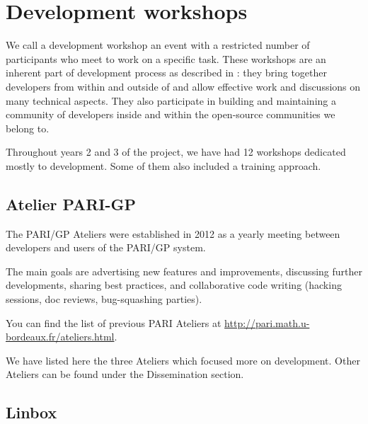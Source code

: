 \documentclass{deliverablereport}
\author{Viviane Pons et al.}
\begin{document}
\enlargethispage{4ex}
\maketitle
\githubissuedescription
\tableofcontents
\newpage


\section{Development workshops}

We call a development workshop an event with a restricted number of participants
who meet to work on a specific task. These workshops are an inherent part
of \ODK development process as described in :
 they bring together
developers from within and outside of \ODK and allow effective work
and discussions on many technical aspects. They also participate in building
and maintaining a community of developers inside \ODK and within the
open-source communities we belong to.

Throughout years 2 and 3 of the project, we have had 12 workshops dedicated mostly
to development. Some of them also included a training approach. 

\subsection{Atelier PARI-GP}

The PARI/GP Ateliers were established in 2012 as a yearly meeting
between developers and users of the PARI/GP system.

The main goals are advertising new features and improvements,
discussing further developments, sharing best practices, and collaborative
code writing (hacking sessions, doc reviews, bug-squashing parties).

You can find the list of previous PARI Ateliers at
\url{http://pari.math.u-bordeaux.fr/ateliers.html}.

We have listed here the three Ateliers which focused more on development. 
Other Ateliers can be found under the Dissemination section.







\subsection{Linbox}
\end{document}
